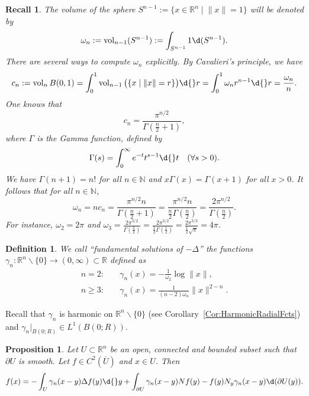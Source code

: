 \documentclass[12pt, oneside, a4paper]{article}
\newtheorem{prop}[thm]{Proposition}
\def\vol{\operatorname{vol}}
\theoremstyle{dfn}
\newtheorem{dfn}[thm]{Definition}
\newtheorem{recall}{Recall}
\def\Nbb{\mathbb{N}}
\def\Rbb{\ensuremath{\mathbb{R}}}
\providecommand{\norm}[1]{\lVert#1\rVert}
\begin{document}
\begin{recall}
The volume of the sphere $S^{n-1} := \{ x \in \Rbb^n \mid \norm{x} = 1 \}$ will be denoted by
\[
\omega_n := \vol_{n-1}(S^{n-1}) := \int_{S^{n-1}} 1 \d(S^{n-1}).
\]
There are several ways to compute $\omega_n$ explicitly. By Cavalieri's principle, we have
\[
c_n := \vol_n B(0,1)
= \int_0^1 \vol_{n-1} \big( \{x \mid \norm{x} = r\} \big) \d{}r
= \int_0^1 \omega_n r^{n-1} \d{}r
= \frac{\omega_n}{n}.
\]
One knows that
\[
c_n = \frac{\pi^{n/2}}{\Gamma(\frac{n}{2} + 1)},
\]
where $\Gamma$ is the Gamma function, defined by
\[
\Gamma(s) = \int_0^\infty e^{-t} t^{s-1} \d{}t \quad(\forall s > 0).
\]
We have $\Gamma(n+1) = n!$ for all $n \in \Nbb$ and $x \Gamma(x) = \Gamma(x+1)$ for all $x > 0$. It follows that for all $n \in \Nbb$,
\[
\omega_n = n c_n = \frac{\pi^{n/2}n}{\Gamma(\frac{n}{2}+1)}
= \frac{\pi^{n/2}n}{\frac{n}{2}\Gamma(\frac{n}{2})}
= \frac{2\pi^{n/2}}{\Gamma(\frac{n}{2})}.
\]
For instance, $\omega_2 = 2\pi$ and
$\displaystyle
\omega_3 = \frac{2\pi^{3/2}}{\Gamma(\frac{3}{2})}
= \frac{2\pi^{3/2}}{\frac{1}{2}\Gamma(\frac{1}{2})}
= \frac{2\pi^{3/2}}{\frac{1}{2}\sqrt{\pi}}
= 4 \pi
$.
\end{recall}

\begin{dfn}
We call ``fundamental solutions of $-\Delta$'' the functions $\gamma_n \colon \Rbb^n \smallsetminus \{0\} \to (0,\infty) \subset \Rbb$ defined as
\begin{align*}
	n = 2\colon \quad & \gamma_n(x) = -\frac{1}{\omega_2} \log \norm{x}, \\
	n \geqslant 3\colon \quad & \gamma_n(x) = \frac{1}{(n-2)\omega_n} \norm{x}^{2-n}.
\end{align*}
\end{dfn}

Recall that $\gamma_n$ is harmonic on $\Rbb^n \smallsetminus \{0\}$ (see Corollary~\ref{Cor:HarmonicRadialFcts}) and $\gamma_n|_{B(0;R)} \in L^1(B(0;R))$.

\begin{prop}\label{Prop:SolutionsOfDelta}
Let $U \subset \Rbb^n$ be an open, connected and bounded subset such that $\partial U$ is smooth. Let $f \in C^2(\overline{U})$ and $x \in U$. Then
\begin{equation}\label{Eq:Prop:SolutionsOfDelta}
f(x) =
- \int_U \gamma_n(x-y) \Delta f(y) \d{}y
+ \int_{\partial U} \gamma_n(x-y) Nf(y) - f(y)N_y \gamma_n(x-y) \d(\partial U(y)).
\end{equation}
\end{prop}
\end{document}
